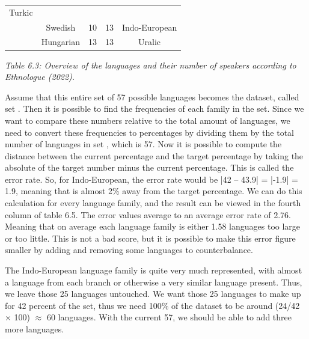 \begin{center}
{\begin{tabular}{|c|c|c|c|c|}
Turkic \\
	\thetablecount\stepcounter{tablecount} &

Swedish &
	

10 &
	

13 &
	

Indo-European \\
	\thetablecount\stepcounter{tablecount}& 

Hungarian &
	

13 &
	

13 &
	

Uralic \\
\hline

\end{tabular}
}
\end{center}

\vspace{0.1cm}
{\it \footnotesize Table 6.3: Overview of the languages and their number of speakers according to Ethnologue (2022).}
\vspace{0.3cm}


\noindent Assume that this entire set of 57 possible languages becomes the dataset, called set \alpha. Then it is possible to find the frequencies of each family in the \alpha set. Since we want to compare these numbers relative to the total amount of languages, we need to convert these frequencies to percentages by dividing them by the total number of languages in set \alpha, which is 57. Now it is possible to compute the distance between the current percentage and the target percentage by taking the absolute of the target number minus the current percentage. This is called the error rate. So, for Indo-European, the error rate would be |42 – 43.9| = |-1.9| = 1.9, meaning that is almost 2\% away from the target percentage. We can do this calculation for every language family, and the result can be viewed in the fourth column of table 6.5. The error values average to an average error rate of 2.76. Meaning that on average each language family is either 1.58 languages too large or too little. This is not a bad score, but it is possible to make this error figure smaller by adding and removing some languages to counterbalance. 

The Indo-European language family is quite very much represented, with almost a language from each branch or otherwise a very similar language present. Thus, we leave those 25 languages untouched. We want those 25 languages to make up for 42 percent of the set, thus we need 100\% of the dataset to be around (24/42 $\times$ 100) $\approx$ 60 languages. With the current 57, we should be able to add three more languages. 

